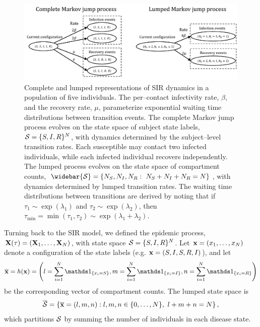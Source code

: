 \begin{figure}
	\centering
	\includegraphics[width=\linewidth]{figures/SIR_representations}
	\caption[Individual and lumped representations of SIR dynamics.]{Complete and lumped representations of SIR dynamics in a population of five individuals. The per--contact infectivity rate, $ \beta $, and the recovery rate, $ \mu $, parameterize exponential waiting time distributions between transition events. The complete Markov jump process evolves on the state space of subject state labels, $ \mathcal{S} = \lbrace S,I,R\rbrace^N $, with dynamics determined by the subject--level transition rates. Each susceptible may contact two infected individuals, while each infected individual recovers independently. The lumped process evolves on the state space of compartment counts, $ \widebar{\mcS} = \lbrace N_S,N_I,N_R:\ N_S + N_I+N_R=N\rbrace $, with dynamics determined by lumped transition rates. The waiting time distributions between transitions are derived by noting that if $ \tau_1\sim \exp(\lambda_1) $ and $ \tau_2\sim\exp(\lambda_2) $, then $ \tau_{\min} = \min(\tau_1,\tau_2)\sim\exp(\lambda_1+\lambda_2) $.}
	\label{fig:sirrepresentations}
\end{figure}

Turning back to the SIR model, we defined the epidemic process, $ \mathbf{X}(\tau) = (\mathbf{X}_1,\dots,\mathbf{X}_N)$, with state space $ \mathcal{S} = \lbrace S, I, R\rbrace^N $. Let $ \mathbf{x} = (x_1,\dots,x_N) $ denote a configuration of the state labels (e.g. $ \mathbf{x} = (S, I, S, R, I) $), and let $$ \overline{\bx} = h(\bx) = \left (l=\sum_{i=1}^N\ind{x_i = S},m=\sum_{i=1}^N\ind{x_i=I},n = \sum_{i=1}^N\ind{x_i=R}\right ) $$ be the corresponding vector of compartment counts. The lumped state space is 
$$ \overline{\mathcal{S}} = \left \lbrace \overline{\mathbf{x}} = (l,m,n): l,m,n \in \lbrace0,\dots,N\rbrace,\  l+m+n = N \right \rbrace, $$ 
which partitions $ \mathcal{S} $ by summing the number of individuals in each disease state. 

